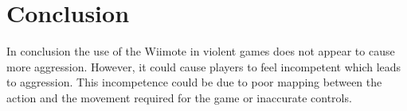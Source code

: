 \documentclass{scrartcl}
\begin{document}
\section{Conclusion}
In conclusion the use of the Wiimote in violent games does not appear to cause more aggression. However, it could cause players to feel incompetent which leads to aggression. This incompetence could be due to poor mapping between the action and the movement required for the game or inaccurate controls. 

	


	
\end{document}

